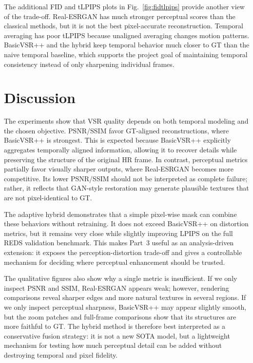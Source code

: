 \documentclass[10pt,twocolumn,letterpaper]{article}
\begin{document}
The additional FID and tLPIPS plots in Fig.~\ref{fig:fidtlpips} provide another view of the trade-off. Real-ESRGAN has much stronger perceptual scores than the classical methods, but it is not the best pixel-accurate reconstruction. Temporal averaging has poor tLPIPS because unaligned averaging changes motion patterns. BasicVSR++ and the hybrid keep temporal behavior much closer to GT than the naive temporal baseline, which supports the project goal of maintaining temporal consistency instead of only sharpening individual frames.

\section{Discussion}
The experiments show that VSR quality depends on both temporal modeling and the chosen objective. PSNR/SSIM favor GT-aligned reconstructions, where BasicVSR++ is strongest. This is expected because BasicVSR++ explicitly aggregates temporally aligned information, allowing it to recover details while preserving the structure of the original HR frame. In contrast, perceptual metrics partially favor visually sharper outputs, where Real-ESRGAN becomes more competitive. Its lower PSNR/SSIM should not be interpreted as complete failure; rather, it reflects that GAN-style restoration may generate plausible textures that are not pixel-identical to GT.

The adaptive hybrid demonstrates that a simple pixel-wise mask can combine these behaviors without retraining. It does not exceed BasicVSR++ on distortion metrics, but it remains very close while slightly improving LPIPS on the full REDS validation benchmark. This makes Part~3 useful as an analysis-driven extension: it exposes the perception-distortion trade-off and gives a controllable mechanism for deciding where perceptual enhancement should be trusted.

The qualitative figures also show why a single metric is insufficient. If we only inspect PSNR and SSIM, Real-ESRGAN appears weak; however, rendering comparisons reveal sharper edges and more natural textures in several regions. If we only inspect perceptual sharpness, BasicVSR++ may appear slightly smooth, but the zoom patches and full-frame comparisons show that its structures are more faithful to GT. The hybrid method is therefore best interpreted as a conservative fusion strategy: it is not a new SOTA model, but a lightweight mechanism for testing how much perceptual detail can be added without destroying temporal and pixel fidelity.
\end{document}
